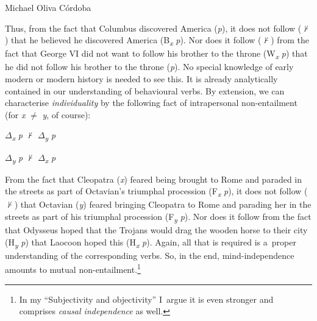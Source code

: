 \begin{artengenv}{Michael Oliva Córdoba}
%
%
%
%
%
%
%
%

Thus, from the fact that Columbus discovered America (\textit{p}), it does not follow (${\nvdash}$) that he believed he discovered America (B\textit{\textsubscript{x}} \textit{p}). Nor does it follow (${\nvdash}$) from the fact that George VI did not want to follow his brother to the throne (W\textit{\textsubscript{x}} \textit{p}) that he did not follow his brother to the throne (\textit{p}). No special knowledge of early modern or modern history is needed to see this. It is already analytically contained in our understanding of behavioural verbs. By extension, we can characterise \textit{individuality} by the following fact of intrapersonal non-entailment (for \textit{x} ${\neq}$ \textit{y}, of course):
\vspace{-.07cm}

\begin{description}[font=\normalfont, labelindent=0pt, leftmargin=!, labelwidth=1cm]
  \item[(Individuality)]
  \item[(i)] $\Delta $\textit{\textsubscript{x}} \textit{p} ${\nvdash}$ $\Delta $\textit{\textsubscript{y}} \textit{p}
  \item[(ii)] $\Delta $\textit{\textsubscript{y}} \textit{p} ${\nvdash}$ $\Delta $\textit{\textsubscript{x}} \textit{p}
\end{description}


%
%
%
%
%
%
%
%

\noindent From the fact that Cleopatra (\textit{x}) feared being brought to Rome and paraded in the streets as part of Octavian's triumphal procession (F\textit{\textsubscript{x}} \textit{p}), it does not follow (${\nvdash}$) that Octavian (\textit{y}) feared bringing Cleopatra to Rome and parading her in the streets as part of his triumphal procession (F\textit{\textsubscript{y}} \textit{p}). Nor does it follow from the fact that Odysseus hoped that the Trojans would drag the wooden horse to their city (H\textit{\textsubscript{y}} \textit{p}) that Laocoon hoped this (H\textit{\textsubscript{x}} \textit{p}). Again, all that is required is a~proper understanding of the corresponding verbs. So, in the end, mind-independence amounts to mutual non-entailment.\footnote{In my ``Subjectivity and objectivity'' I~argue it is even stronger and comprises \textit{causal independence} as well.}




\end{artengenv}
